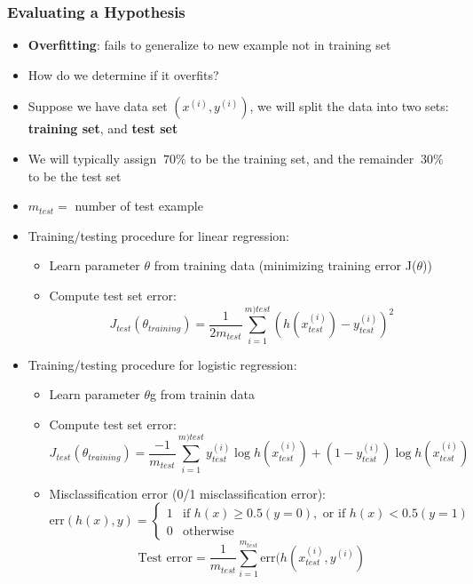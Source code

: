 \subsubsection{Evaluating a Hypothesis}
\begin{itemize}[--]
	\item \textbf{Overfitting}: fails to generalize to new example not in training set
	\item How do we determine if it overfits?
	\item Suppose we have data set ${(x^{(i)}, y^{(i)} )}$, we will split the data into two sets: \textbf{training set}, and \textbf{test set}
	\item We will typically assign $~70\%$ to be the training set, and the remainder $~30\%$ to be the test set
	\item $m_{test}=$ number of test example
	\item Training/testing procedure for linear regression:
	\begin{itemize}[--]
		\item Learn parameter $\theta$ from training data (minimizing training error J($\theta$))
		\item Compute test set error:
			$$J_{test}(\theta_{training})=\frac{1}{2m_{test}}\sum_{i=1}^{m){test}}(h(x_{test}^{(i)}) - y_{test}^{(i)})^2$$
	\end{itemize} 

	\item Training/testing procedure for logistic regression:
	\begin{itemize}[--]
		\item Learn parameter $\theta$g from trainin data 
		\item Compute test set error:
			$$J_{test}(\theta_{training})=\frac{-1}{m_{test}}\sum_{i=1}^{m){test}}y_{test}^{(i)}\log h(x_{test}^{(i)}) + (1-y_{test}^{(i)}) \log h(x_{test}^{(i)} )$$
		\item Misclassification error (0/1 misclassification error):
			$$\text{err}(h(x), y)=\begin{cases}
				1 &\text{if } h(x)\geq 0.5 (y=0), \text{ or if } h(x)<0.5 (y=1)\\
				0 &\text{otherwise}
			\end{cases}$$
			$$\text{Test error} = \frac{1}{m_{test}}\sum_{i=1}^{m_{test}}\text{err}(h(x_{test}^{(i)}, y^{(i)})$$
	\end{itemize} 


\end{itemize}

